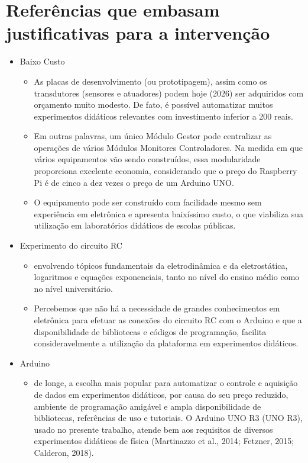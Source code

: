 \documentclass{article}
\begin{document}
\section{Referências que embasam justificativas para a intervenção}
\begin{itemize}
	\item{Baixo Custo}
		\begin{itemize}
			\item As placas de desenvolvimento (ou prototipagem), assim como os transdutores (sensores e atuadores) podem hoje (2026) ser adquiridos com orçamento muito modesto. De fato, é possível automatizar muitos experimentos didáticos relevantes com investimento inferior a 200 reais. \cite{rogerio}
			\item Em outras palavras, um único Módulo Gestor pode centralizar as operações de vários Módulos Monitores Controladores. Na medida em que vários equipamentos vão sendo construídos, essa modularidade proporciona excelente economia, considerando que o preço do Raspberry Pi é de cinco a dez vezes o preço de um Arduino UNO. \cite{rogerio}
			\item O equipamento pode ser construído com facilidade mesmo sem experiência em eletrônica e apresenta baixíssimo custo, o que viabiliza sua utilização em laboratórios didáticos de escolas públicas. \cite{kit}
		\end{itemize}
	\item{Experimento do circuito RC}
		\begin{itemize}
			\item [\dots] envolvendo tópicos fundamentais da eletrodinâmica e da eletrostática, logaritmos e equações exponenciais, tanto no nível do ensino médio como no nível universitário. \cite{rogerio}
			\item Percebemos que não há a necessidade de grandes conhecimentos em eletrônica para efetuar as conexões do circuito RC com o Arduino e que a disponibilidade de bibliotecas e códigos de programação, facilita consideravelmente a utilização da plataforma em experimentos didáticos. \cite{iniciantes}
		\end{itemize}
	\item{Arduino}
		\begin{itemize}
			\item de longe, a escolha mais popular para automatizar o controle e aquisição de dados em experimentos didáticos, por causa do seu preço reduzido, ambiente de programação amigável e ampla disponibilidade de bibliotecas, referências de uso e tutoriais. O Arduino UNO R3 (UNO R3), usado no presente trabalho, atende bem aos requisitos de diversos experimentos didáticos de física (Martinazzo et al., 2014; Fetzner, 2015; Calderon, 2018).  \cite{rogerio}

\end{itemize}
\end{itemize}
\end{document}
